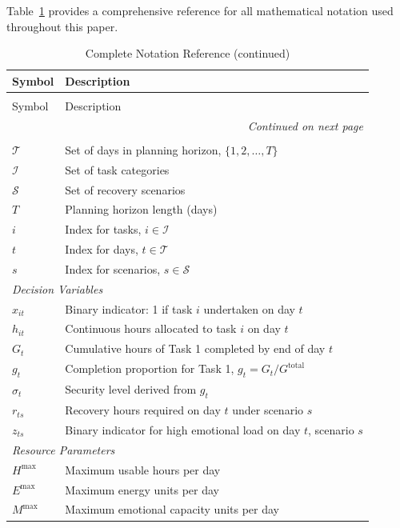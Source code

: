 \documentclass[preprint,review,11pt]{elsarticle}
\begin{document}
Table~\ref{tab:notation} provides a comprehensive reference for all mathematical notation used throughout this paper.

\begin{longtable}{ll}
\caption{Complete Notation Reference}
\label{tab:notation} \\
\toprule
Symbol & Description \\
\midrule
\endfirsthead
\caption[]{Complete Notation Reference (continued)} \\
\toprule
Symbol & Description \\
\midrule
\endhead
\midrule
\multicolumn{2}{r}{\textit{Continued on next page}} \\
\endfoot
\bottomrule
\endlastfoot
\multicolumn{2}{l}{\textit{Sets and Indices}} \\
$\mathcal{T}$ & Set of days in planning horizon, $\{1, 2, \ldots, T\}$ \\
$\mathcal{I}$ & Set of task categories \\
$\mathcal{S}$ & Set of recovery scenarios \\
$T$ & Planning horizon length (days) \\
$i$ & Index for tasks, $i \in \mathcal{I}$ \\
$t$ & Index for days, $t \in \mathcal{T}$ \\
$s$ & Index for scenarios, $s \in \mathcal{S}$ \\
\midrule
\multicolumn{2}{l}{\textit{Decision Variables}} \\
$x_{it}$ & Binary indicator: 1 if task $i$ undertaken on day $t$ \\
$h_{it}$ & Continuous hours allocated to task $i$ on day $t$ \\
$G_t$ & Cumulative hours of Task 1 completed by end of day $t$ \\
$g_t$ & Completion proportion for Task 1, $g_t = G_t / G^{\text{total}}$ \\
$\sigma_t$ & Security level derived from $g_t$ \\
$r_{ts}$ & Recovery hours required on day $t$ under scenario $s$ \\
$z_{ts}$ & Binary indicator for high emotional load on day $t$, scenario $s$ \\
\midrule
\multicolumn{2}{l}{\textit{Resource Parameters}} \\
$H^{\max}$ & Maximum usable hours per day \\
$E^{\max}$ & Maximum energy units per day \\
$M^{\max}$ & Maximum emotional capacity units per day \\

\end{longtable}
\end{document}
